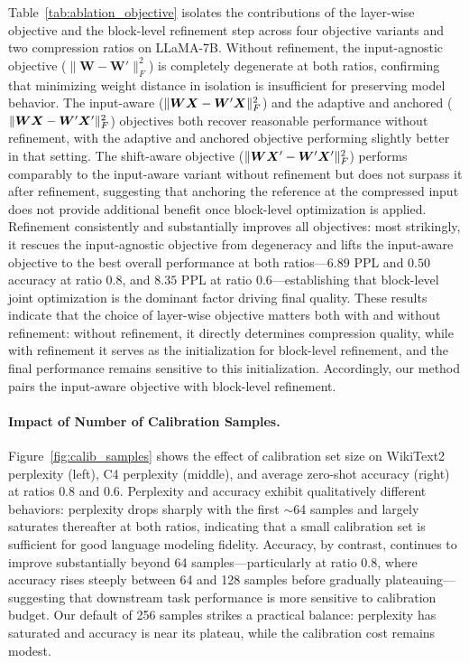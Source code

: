 \documentclass[10pt]{article} %
\theoremstyle{definition}
\theoremstyle{remark}
\begin{document}
Table~\ref{tab:ablation_objective} isolates the contributions of the layer-wise objective and the block-level refinement step across four objective variants and two compression ratios on LLaMA-7B.
Without refinement, the input-agnostic objective ($\|\bm{W} - \bm{W}'\|_F^2$) is completely degenerate at both ratios, confirming that minimizing weight distance in isolation is insufficient for preserving model behavior.
The input-aware ($\|\bm{W}{\bm{X}} - \bm{W}'{\bm{X}}\|_F^2$) and the adaptive and anchored ($\|\bm{W}{\bm{X}} - \bm{W}'{\bm{X}}'\|_F^2$) objectives both recover reasonable performance without refinement, with the adaptive and anchored objective performing slightly better in that setting.
The shift-aware objective ($\|\bm{W}{\bm{X}}' - \bm{W}'{\bm{X}}'\|_F^2$) performs comparably to the input-aware variant without refinement but does not surpass it after refinement, suggesting that anchoring the reference at the compressed input does not provide additional benefit once block-level optimization is applied.
Refinement consistently and substantially improves all objectives: most strikingly, it rescues the input-agnostic objective from degeneracy and lifts the input-aware objective to the best overall performance at both ratios---$6.89$ PPL and $0.50$ accuracy at ratio $0.8$, and $8.35$ PPL at ratio $0.6$---establishing that block-level joint optimization is the dominant factor driving final quality.
These results indicate that the choice of layer-wise objective matters both with and without refinement: without refinement, it directly determines compression quality, while with refinement it serves as the initialization for block-level refinement, and the final performance remains sensitive to this initialization. Accordingly, our method pairs the input-aware objective with block-level refinement.
% 
\paragraph{Impact of Number of Calibration Samples.}
Figure~\ref{fig:calib_samples} shows the effect of calibration set size on WikiText2 perplexity (left), C4 perplexity (middle), and average zero-shot accuracy (right) at ratios $0.8$ and $0.6$.
Perplexity and accuracy exhibit qualitatively different behaviors: perplexity drops sharply with the first $\sim$64 samples and largely saturates thereafter at both ratios, indicating that a small calibration set is sufficient for good language modeling fidelity.
Accuracy, by contrast, continues to improve substantially beyond 64 samples---particularly at ratio $0.8$, where accuracy rises steeply between 64 and 128 samples before gradually plateauing---suggesting that downstream task performance is more sensitive to calibration budget.
Our default of 256 samples strikes a practical balance: perplexity has saturated and accuracy is near its plateau, while the calibration cost remains modest.
\end{document}
